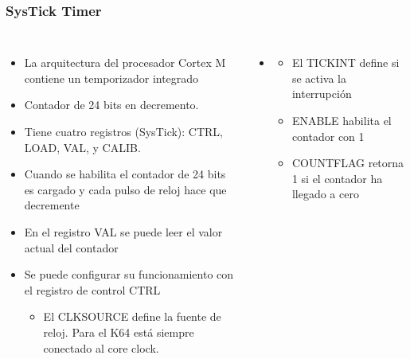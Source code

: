 \documentclass[10.5pt,scale=1.0,t,aspectratio=169,hyperref={pdfpagelabels=false}]{beamer}
\begin{document}
\begin{frame}
	\frametitle{SysTick Timer }
	{\small
		\begin{columns}
			\begin{itemize}
				\item La arquitectura del procesador Cortex M contiene un temporizador integrado
				\item Contador de 24 bits en decremento. 
				\item Tiene cuatro registros (SysTick): CTRL, LOAD, VAL, y CALIB.
				\item Cuando se habilita el contador de 24 bits es cargado y cada pulso de reloj hace que decremente
				\item En el registro VAL se puede leer el valor actual del contador
				\item Se puede configurar su funcionamiento con el registro de control CTRL
				\begin{itemize}
					\item El CLKSOURCE define la fuente de reloj. Para el K64 está siempre conectado al core clock. 
				\end{itemize}
			\end{itemize}
			
			\begin{itemize}
				\item[] \begin{itemize}
					\item El TICKINT define si se activa la interrupción
					\item ENABLE habilita el contador con 1
					\item COUNTFLAG retorna 1 si el contador ha llegado a cero
				\end{itemize}
			\end{itemize}
			
		\end{columns}
	}
\end{frame}
\end{document}
